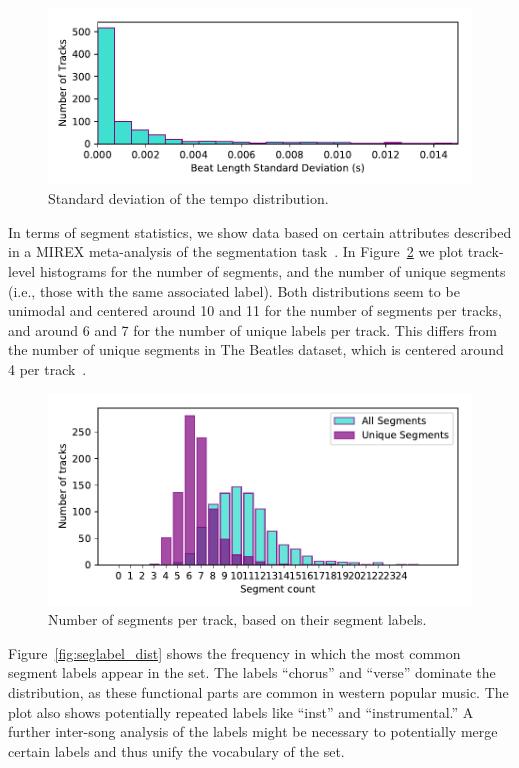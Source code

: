 \documentclass{article}
\begin{document}
\begin{figure}
    \centerline{\includegraphics[width=\columnwidth]{figs/BPM_std.pdf}}
    \caption{Standard deviation of the tempo distribution.}
    \label{fig:BPM_std}
\end{figure}

In terms of segment statistics, we show data based on certain attributes described in a MIREX meta-analysis of the segmentation task~\cite{Smith2013}.
In Figure~\ref{fig:segment_count} we plot track-level histograms for the number of segments, and the number of unique segments (i.e., those with the same associated label).
Both distributions seem to be unimodal and centered around 10 and 11 for the number of segments per tracks, and around 6 and 7 for the number of unique labels per track.
This differs from the number of unique segments in The Beatles dataset, which is centered around 4 per track~\cite{Nieto2014}.

\begin{figure}
    \centerline{\includegraphics[width=\columnwidth]{figs/segment_label_count.pdf}}
    \caption{Number of segments per track, based on their segment labels.}
    \label{fig:segment_count}
\end{figure}

Figure~\ref{fig:seglabel_dist} shows the frequency in which the most common segment labels appear in the set.
The labels ``chorus'' and ``verse'' dominate the distribution, as these functional parts are common in western popular music.
The plot also shows potentially repeated labels like ``inst'' and ``instrumental.''
A further inter-song analysis of the labels might be necessary to potentially merge certain labels and thus unify the vocabulary of the set.
\end{document}

